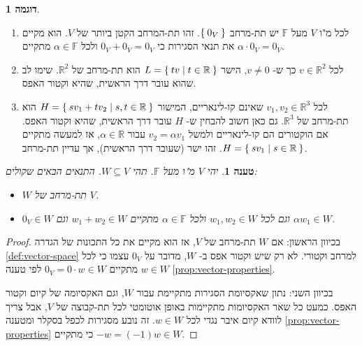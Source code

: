 \documentclass[12pt]{report}
\theoremstyle{plain}
\newtheorem{proposition}[theorem]{טענה}
\theoremstyle{definition}
\newtheorem{example}{דוגמה}[chapter]
\newcommand{\R}{\mathbb{R}}
\newcommand{\F}{\mathbb{F}}
\newcommand{\0}{\mathbf{0}}
\begin{document}
\begin{example}\
\begin{enumerate}[label=\alph*.]
\item 
לכל מ"ו 
$V$
מעל
$\F$
יש תת-מרחב
$\Set{0_V}$. 
זהו תת-המרחב הקטן ביותר של
$V$.
הוא מקיים את תנאי הסגירות כי
$0_V+0_V=0_V$
ולכל
$\alpha\in\F$
מתקיים
$\alpha\cdot 0_V=0_V$.


\item 
לכל
$v\in\R^2$
כך ש-
$v\neq 0$,
הישר
$L=\Set{tv|t\in\R}$
הוא תת-מרחב של 
$\R^2$.
שימו לב שהוא עובר דרך הראשית, שהיא וקטור האפס.


\item
לכל
$v_1,v_2\in\R^3$
שאינם קו-לינאריים,
המישור
$H=\Set{sv_1+tv_2|s,t\in\R}$
הוא תת-מרחב של
$\R^3$.
גם כאן חשוב להבחין ש-
$H$
עובר דרך הראשית, שהיא וקטור האפס. אם הוקטורים הם קו-לינאריים ולמשל
$v_2=\alpha v_1$
עבור
$\alpha\in\R$,
אז למעשה מתקיים
$H=\Set{sv_1|s\in\R}$.
זהו ישר (שעובר דרך הראשית), אך עדיין תת-מרחב.


\end{enumerate}
\end{example}

\begin{proposition}\label{prop:subspace}
יהי
$V$
מ"ו מעל
$\F$.
תהי
$W\subseteq V$.
התנאים הבאים שקולים:

\begin{itemize}
\item 
$W$
תת-מרחב של
$V$.


\item 
$0_V\in W$
וגם לכל
$w_1,w_2\in W$
ולכל
$\alpha\in \F$
מתקיים
$w_1+w_2\in W$
וגם
$\alpha w_1\in W$.


\end{itemize}
\end{proposition}

\begin{proof}
בכיוון הראשון: אם 
$W$
תת-מרחב של
$V$,
אז הוא מקיים את כל התכונות של הגדרה
\ref{def:vector-space}
למרחב וקטורי. לא רק שיש וקטור אפס ב-
$W$,
מדובר על
$0_V$
עצמו כי לכל 
$w\in W$
מתקיים
$0_V=0\cdot w\in W$
לפי טענה
\ref{prop:vector-properties}.

בכיוון השני: נתון שאקסיומת הסגירות מתקיימת עבור
$W$,
וגם האקסיומה של קיום וקטור האפס. כמעט כל שאר האקסיומות מתקיימות באופן אוטומטי לכל תת-קבוצה של
$V$,
אבל צריך לוודא קיום איבר נגדי לכל
$w\in W$.
זה נובע מסגירות לכפל בסקלר ומטענה
\ref{prop:vector-properties}
כי מתקיים
$-w=(-1)w\in W$.

\end{proof}
\end{document}
